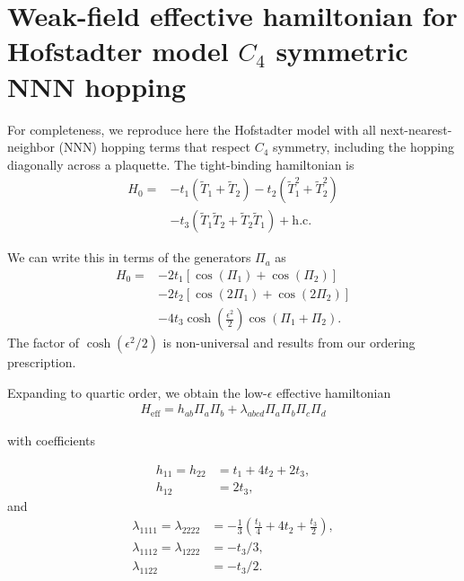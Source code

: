 \documentclass[aps,prb,twocolumn,letterpaper,twoside,nobalancelastpage,groupedaddress,amsmath,amssymb,floatfix,citeautoscript]{revtex4-1}
\begin{document}
\clearpage
\appendix
\section{Weak-field effective hamiltonian for Hofstadter model $C_4$ symmetric NNN hopping}
For completeness, we reproduce here the  Hofstadter model with all next-nearest-neighbor (NNN) hopping terms that respect $C_4$ symmetry, including the hopping diagonally across a plaquette. The tight-binding hamiltonian is
\begin{align*}
H_0 = &-t_1 \left(\widetilde{T}_1 + \widetilde{T}_2\right)\nonumber - t_2 \left(\widetilde{T}_1^{2} + \widetilde{T}_2^{2}\right)\\ &- t_3 \left(\widetilde{T}_1\widetilde{T}_2 + \widetilde{T}_2 \widetilde{T}_1\right) + \text{h.c.}
\end{align*}

We can write this in terms of the generators $\Pi_a$ as
\begin{align*}
H_0 = &-2t_1 \left[\cos\left(\Pi_1\right) + \cos\left(\Pi_2\right)\right]\\ &-2t_2 \left[\cos\left(2\Pi_1\right)+\cos\left(2\Pi_2\right)\right]\\ &- 4t_3 \cosh\left(\frac{\epsilon^2}{2}\right)\cos\left(\Pi_1 + \Pi_2\right).
\end{align*}
The factor of $\cosh(\epsilon^2/2)$ is non-universal and results from our ordering prescription.

Expanding to quartic order, we obtain the low-$\epsilon$ effective hamiltonian
\begin{align*}
H_{\text{eff}} = h_{ab}\Pi_a \Pi_b + \lambda_{abcd} \Pi_a \Pi_b \Pi_c \Pi_d 
\end{align*}

with coefficients

\begin{align*}
h_{11} = h_{22} &= t_1 + 4t_2 + 2t_3,\\
h_{12} &= 2t_3,
\end{align*}
and 
\begin{align*}
\lambda_{1111} = \lambda_{2222} &= -\frac{1}{3}\left(\frac{t_1}{4} + 4t_2 + \frac{t_3}{2} \right),\\
\lambda_{1112}  = \lambda_{1222} &= -t_3/3,\\
\lambda_{1122} &= -t_3/2.
\end{align*}
\end{document}
